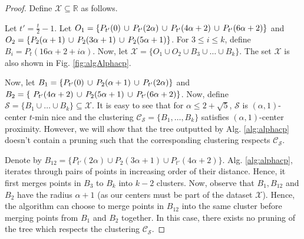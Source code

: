 \documentclass[anon,12pt]{colt2016} %
\newcommand{\mc}{\mathcal}
\begin{document}
\begin{proof}
Define $\mc X \subseteq \mathbb{R}$ as follows. 

Let $t' = \frac{t}{2}-1$. Let $O_1 = \{P_{t'}(0) \thinspace\cup\thinspace P_{t'}(2\alpha) \thinspace\cup\thinspace P_{t'}(4\alpha+2) \thinspace\cup\thinspace P_{t'}(6\alpha+2)\}$ and $O_2 = \{P_{2}(\alpha+1) \thinspace\cup\thinspace P_{2}(3\alpha+1) \thinspace\cup\thinspace P_{2}(5\alpha+1) \}$. For $3\le i\le k$, define $B_i = P_t (16\alpha+2+i \alpha )$. Now, let $\mc X = \{ O_1 \cup O_2 \cup B_3 \cup \ldots \cup B_k \}$. The set $\mc X$ is also shown in Fig. \ref{fig:algAlphacp}.

Now, let $B_1 = \{P_{t'}(0) \thinspace\cup\thinspace  P_{2}(\alpha+1) \thinspace\cup\thinspace P_{t'}(2\alpha) \}$ and $B_2 = \{\ P_{t'}(4\alpha+2) \thinspace\cup\thinspace P_{2}(5\alpha+1)\thinspace\cup\thinspace P_{t'}(6\alpha+2)\}$. Now, define $\mc S = \{B_1 \cup \ldots \cup B_k\} \subseteq \mc X$. It is easy to see that for $\alpha \le 2+\sqrt{5}$, $\mc S$ is $(\alpha, 1)$-center $t$-min nice and the clustering $\mc C_{\mc S} = \{B_1, \ldots, B_k\}$ satisfies $(\alpha, 1)$-center proximity. However, we will show that the tree outputted by Alg. \ref{alg:alphacp} doesn't contain a pruning such that the corresponding clustering respects $\mc C_{\mc S}$.

Denote by $B_{12} = \{P_{t'}(2\alpha) \cup P_{2}(3\alpha+1) \cup P_{t'}(4\alpha+2) \}$. Alg. \ref{alg:alphacp}, iterates through pairs of points in increasing order of their distance. Hence, it first merges points in $B_3$ to $B_k$ into $k-2$ clusters. Now, observe that $B_1, B_{12}$ and $B_{2}$ have the radius $\alpha + 1$ (as our centers must be part of the dataset $\mc X$). Hence, the algorithm can choose to merge points in $B_{12}$ into the same cluster before merging points from $B_1$ and $B_2$ together. In this case, there exists no pruning of the tree which respects the clustering $\mc C_{\mc S}$.
\end{proof}
\end{document}
